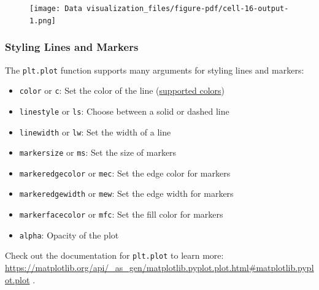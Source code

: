 \documentclass[
  letterpaper,
  DIV=11,
  numbers=noendperiod]{scrreprt}
\providecommand{\tightlist}{%
  \setlength{\itemsep}{0pt}\setlength{\parskip}{0pt}}\usepackage{longtable,booktabs,array}
\begin{document}
\begin{figure}[H]

{\centering \texttt{[image: Data visualization\_files/figure-pdf/cell-16-output-1.png]}

}

\end{figure}

\hypertarget{styling-lines-and-markers}{%
\subsubsection{Styling Lines and
Markers}\label{styling-lines-and-markers}}

The \texttt{plt.plot} function supports many arguments for styling lines
and markers:

\begin{itemize}
\tightlist
\item
  \texttt{color} or \texttt{c}: Set the color of the line
  (\href{https://matplotlib.org/3.1.0/gallery/color/named_colors.html}{supported
  colors})
\item
  \texttt{linestyle} or \texttt{ls}: Choose between a solid or dashed
  line
\item
  \texttt{linewidth} or \texttt{lw}: Set the width of a line
\item
  \texttt{markersize} or \texttt{ms}: Set the size of markers
\item
  \texttt{markeredgecolor} or \texttt{mec}: Set the edge color for
  markers
\item
  \texttt{markeredgewidth} or \texttt{mew}: Set the edge width for
  markers
\item
  \texttt{markerfacecolor} or \texttt{mfc}: Set the fill color for
  markers
\item
  \texttt{alpha}: Opacity of the plot
\end{itemize}

Check out the documentation for \texttt{plt.plot} to learn more:
\url{https://matplotlib.org/api/_as_gen/matplotlib.pyplot.plot.html\#matplotlib.pyplot.plot}
.
\end{document}
